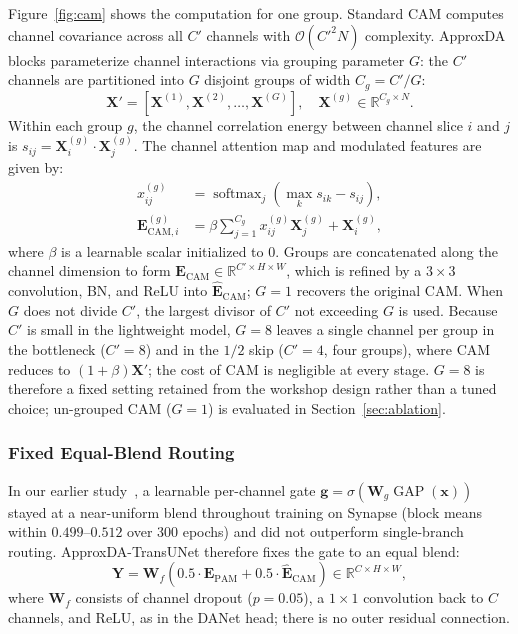 Figure~\ref{fig:cam} shows the computation for one group. Standard CAM computes channel covariance across all $C'$ channels with $\mathcal{O}(C'^2 N)$ complexity. ApproxDA blocks parameterize channel interactions via grouping parameter $G$: the $C'$ channels are partitioned into $G$ disjoint groups of width $C_g = C'/G$:
\begin{equation}
    \mathbf{X}' = \left[ \mathbf{X}^{(1)}, \mathbf{X}^{(2)}, \dots, \mathbf{X}^{(G)} \right], \quad \mathbf{X}^{(g)} \in \mathbb{R}^{C_g \times N}.
\end{equation}
Within each group $g$, the channel correlation energy between channel slice $i$ and $j$ is $s_{ij} = \mathbf{X}_i^{(g)} \cdot \mathbf{X}_j^{(g)}$. The channel attention map and modulated features are given by:
\begin{align}
    x_{ij}^{(g)} &= \operatorname{softmax}_j \left( \max_k s_{ik} - s_{ij} \right), \\
    \mathbf{E}_{\text{CAM}, i}^{(g)} &= \beta \sum_{j=1}^{C_g} x_{ij}^{(g)} \mathbf{X}_j^{(g)} + \mathbf{X}_i^{(g)},
\end{align}
where $\beta$ is a learnable scalar initialized to 0. Groups are concatenated along the channel dimension to form $\mathbf{E}_{\text{CAM}} \in \mathbb{R}^{C' \times H \times W}$, which is refined by a $3 \times 3$ convolution, BN, and ReLU into $\hat{\mathbf{E}}_{\text{CAM}}$; $G=1$ recovers the original CAM. When $G$ does not divide $C'$, the largest divisor of $C'$ not exceeding $G$ is used. Because $C'$ is small in the lightweight model, $G=8$ leaves a single channel per group in the bottleneck ($C'=8$) and in the $1/2$ skip ($C'=4$, four groups), where CAM reduces to $(1+\beta)\mathbf{X}'$; the cost of CAM is negligible at every stage. $G=8$ is therefore a fixed setting retained from the workshop design rather than a tuned choice; un-grouped CAM ($G=1$) is evaluated in Section~\ref{sec:ablation}.

\subsubsection{Fixed Equal-Blend Routing}
In our earlier study~\cite{zhong2026approxda}, a learnable per-channel gate $\mathbf{g} = \sigma(\mathbf{W}_g \operatorname{GAP}(\mathbf{x}))$ stayed at a near-uniform blend throughout training on Synapse (block means within $0.499$--$0.512$ over 300 epochs) and did not outperform single-branch routing. ApproxDA-TransUNet therefore fixes the gate to an equal blend:
\begin{equation}
    \mathbf{Y} = \mathbf{W}_f \left( 0.5 \cdot \hat{\mathbf{E}}_{\text{PAM}} + 0.5 \cdot \hat{\mathbf{E}}_{\text{CAM}} \right) \in \mathbb{R}^{C \times H \times W},
\end{equation}
where $\mathbf{W}_f$ consists of channel dropout ($p=0.05$), a $1 \times 1$ convolution back to $C$ channels, and ReLU, as in the DANet head; there is no outer residual connection.

